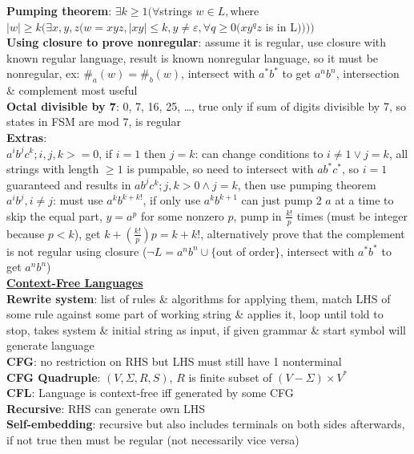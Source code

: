 \documentclass[a4paper]{article}
\begin{document}
\begin{multicols}{2}
        \textbf{Pumping theorem}: $\exists k \geq 1 (\forall $strings $w \in L, $where$ |w| \geq k (\exists x, y, z (w = xyz, |xy| \leq k, y \neq \varepsilon, \forall q \geq 0 (x y^q z$ is in L$))))$\\
        \textbf{Using closure to prove nonregular}: assume it is regular, use closure with known regular language, result is known nonregular language, so it must be nonregular, ex: $\#_a (w) = \#_b (w)$, intersect with $a^* b^*$ to get $a^n b^n$, intersection \& complement most useful\\
        \textbf{Octal divisible by 7}: 0, 7, 16, 25, \ldots, true only if sum of digits divisible by 7, so states in FSM are mod 7, is regular\\
        \textbf{Extras}:\\
        \boldmath$a^i b^j c^k; i, j, k >= 0$, if $i = 1$ then $j = k$\unboldmath: can change conditions to $i \neq 1 \vee j = k$, all strings with length $\geq 1$ is pumpable, so need to intersect with $a b^* c^*$, so $i = 1$ guaranteed and results in $a b^j c^k; j, k > 0 \wedge j = k$, then use pumping theorem\\
        \boldmath$a^i b^j, i \neq j$\unboldmath: must use $a^k b^{k+k!}$, if only use $a^k b^{k+1}$ can just pump 2 $a$ at a time to skip the equal part, $y = a^p$ for some nonzero $p$, pump in $\frac{k!}{p}$ times (must be integer because $p < k$), get $k + (\frac{k!}{p})p = k+k! $, alternatively prove that the complement is not regular using closure ($\neg L = a^n b^n \cup \{$out of order$\}$, intersect with $a^* b^*$ to get $a^n b^n$)\\
        \underline{\textbf{Context-Free Languages}}\\
        \textbf{Rewrite system}: list of rules \& algorithms for applying them, match LHS of some rule against some part of working string \& applies it, loop until told to stop, takes system \& initial string as input, if given grammar \& start symbol will generate language\\
        \textbf{CFG}: no restriction on RHS but LHS must still have 1 nonterminal\\
        \textbf{CFG Quadruple}: $(V, \Sigma, R, S)$, $R$ is finite subset of $(V - \Sigma) \times V^*$\\
        \textbf{CFL}: Language is context-free iff generated by some CFG\\
        \textbf{Recursive}: RHS can generate own LHS\\
        \textbf{Self-embedding}: recursive but also includes terminals on both sides afterwards, if not true then must be regular (not necessarily vice versa)\\

\end{multicols}
\end{document}
